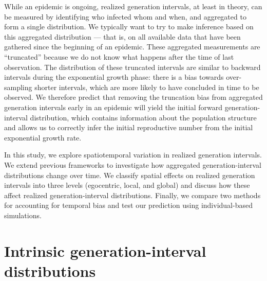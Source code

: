 \documentclass[12pt]{article}
\begin{document}
While an epidemic is ongoing, realized generation intervals, at least in theory, can be measured by identifying who infected whom and when, and aggregated to form a single distribution.
We typically want to try to make inference based on this aggregated distribution --- that is, on all available data that have been gathered since the beginning of an epidemic.
These aggregated measurements are ``truncated'' because we do not know what happens after the time of last observation.
The distribution of these truncated intervals are similar to backward intervals during the exponential growth phase: there is a bias towards over-sampling shorter intervals, which are more likely to have concluded in time to be observed.
We therefore predict that removing the truncation bias from aggregated generation intervals early in an epidemic will yield the initial forward generation-interval distribution, which contains information about the population structure and allows us to correctly infer the initial reproductive number from the initial exponential growth rate.

In this study, we explore spatiotemporal variation in realized generation intervals.
We extend previous frameworks to investigate how aggregated generation-interval distributions change over time.
We classify spatial effects on realized generation intervals into three levels (egocentric, local, and global) and discuss how these affect realized generation-interval distributions.
Finally, we compare two methods for accounting for temporal bias and test our prediction using individual-based simulations.

\section{Intrinsic generation-interval distributions}
\end{document}
